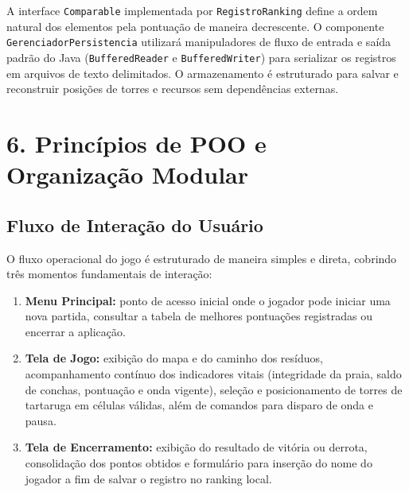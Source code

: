 \documentclass[11pt,a4paper]{article}
\begin{document}
A interface \texttt{Comparable} implementada por \texttt{RegistroRanking} define a ordem natural dos elementos pela pontuação de maneira decrescente. O componente \texttt{GerenciadorPersistencia} utilizará manipuladores de fluxo de entrada e saída padrão do Java (\texttt{BufferedReader} e \texttt{BufferedWriter}) para serializar os registros em arquivos de texto delimitados. O armazenamento é estruturado para salvar e reconstruir posições de torres e recursos sem dependências externas.

\clearpage
\section*{6. Princípios de POO e Organização Modular}
\subsection*{Fluxo de Interação do Usuário}
O fluxo operacional do jogo é estruturado de maneira simples e direta, cobrindo três momentos fundamentais de interação:
\begin{enumerate}
    \item \textbf{Menu Principal:} ponto de acesso inicial onde o jogador pode iniciar uma nova partida, consultar a tabela de melhores pontuações registradas ou encerrar a aplicação.
    \item \textbf{Tela de Jogo:} exibição do mapa e do caminho dos resíduos, acompanhamento contínuo dos indicadores vitais (integridade da praia, saldo de conchas, pontuação e onda vigente), seleção e posicionamento de torres de tartaruga em células válidas, além de comandos para disparo de onda e pausa.
    \item \textbf{Tela de Encerramento:} exibição do resultado de vitória ou derrota, consolidação dos pontos obtidos e formulário para inserção do nome do jogador a fim de salvar o registro no ranking local.
\end{enumerate}
\end{document}
